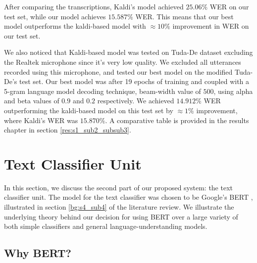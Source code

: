 After comparing the transcriptions, Kaldi's model achieved $25.06\%$ \ac{WER} on our test set, while our model achieves $15.587\%$ \ac{WER}. This means that our best model outperforms the kaldi-based model with $\approx10\%$ improvement in \ac{WER} on our test set.


We also noticed that Kaldi-based model was tested on Tuda-De dataset excluding the Realtek microphone since it's very low quality. We excluded all utterances recorded using this microphone, and tested our best model on the modified Tuda-De's test set. Our best model was after 19 epochs of training and coupled with a 5-gram language model decoding technique, beam-width value of $500$, using alpha and beta values of $0.9$ and $0.2$ respectively. We achieved $14.912\%$ \ac{WER} outperforming the kaldi-based model on this test set by $\approx 1\%$ improvement, where Kaldi's \ac{WER} was $15.870\%$. A comparative table is provided in the results chapter in section \ref{res:s1_sub2_subsub3}.


\newpage



































\section{Text Classifier Unit} 
\label{meth:s5}

In this section, we discuss the second part of our proposed system: the text classifier unit. The model for the text classifier was chosen to be Google's \acf{BERT} \cite{devlin2018bert}, illustrated in section \ref{bg:s4_sub4} of the literature review. We illustrate the underlying theory behind our decision for using \ac{BERT} over a large variety of both simple classifiers and general language-understanding models.

\subsection{Why BERT?}
\label{meth:s5_sub1}


